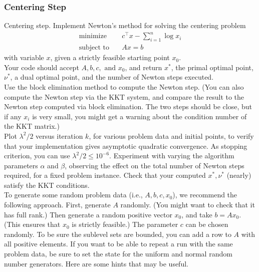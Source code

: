 \subsubsection{Centering Step}
Centering step. Implement Newton’s method for solving the centering problem
\begin{align}
  \text{minimize} & \quad c^\top x - \sum_{i=1}^n \log x_i \\
  \text{subject to} & \quad Ax = b
\end{align}
with variable $x$, given a strictly feasible starting point $x_0$. \\
Your code should accept $A,b,c, \text{ and } x_0$, and return $x^*$, the primal optimal point, $\nu^*$, a dual optimal point, and the number of Newton steps executed. \\
Use the block elimination method to compute the Newton step. (You can also compute
the Newton step via the KKT system, and compare the result to the Newton step
computed via block elimination. The two steps should be close, but if any $x_i$
is very small, you might get a warning about the condition number of the KKT matrix.) \\
Plot $\lambda^2/2$ versus iteration $k$, for various problem data and initial points, to verify that
your implementation gives asymptotic quadratic convergence. As stopping criterion,
you can use $\lambda^2/2 \leq 10^{-6}$. Experiment with varying the algorithm parameters $\alpha$ and $\beta$,
observing the effect on the total number of Newton steps required, for a fixed problem
instance. Check that your computed $x^*, \nu^*$
(nearly) satisfy the KKT conditions. \\
To generate some random problem data (i.e., $A, b, c, x_0$), we recommend the following
approach. First, generate $A$ randomly. (You might want to check that it has full rank.)
Then generate a random positive vector $x_0$, and take $b = Ax_0$. (This ensures that $x_0$
is strictly feasible.) The parameter $c$ can be chosen randomly. To be sure the sublevel
sets are bounded, you can add a row to $A$ with all positive elements. If you want to
be able to repeat a run with the same problem data, be sure to set the state for the
uniform and normal random number generators.
Here are some hints that may be useful.
